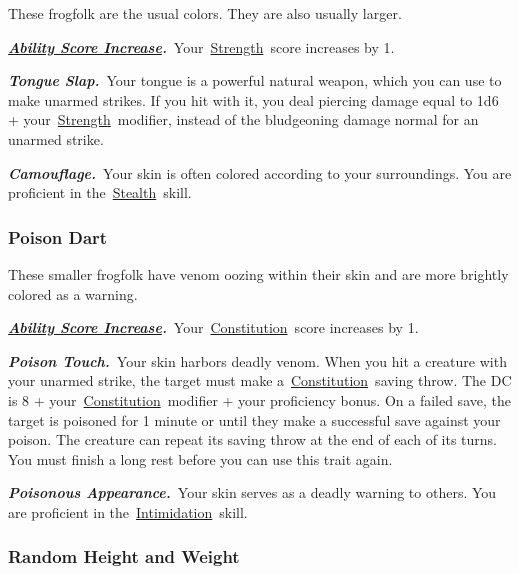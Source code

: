 These frogfolk are the usual colors. They are also usually larger.

\textbf{\emph{\href{https://www.dandwiki.com/wiki/5e_SRD:About_Races\#Ability_Score_Increase}{Ability
Score
Increase}.}}~Your~\href{https://www.dandwiki.com/wiki/5e_SRD:Strength}{Strength}~score
increases by 1.

\textbf{\emph{Tongue Slap.}}~Your tongue is a powerful natural weapon,
which you can use to make unarmed strikes. If you hit with it, you deal
piercing damage equal to 1d6 +
your~\href{https://www.dandwiki.com/wiki/5e_SRD:Strength}{Strength}~modifier,
instead of the bludgeoning damage normal for an unarmed strike.

\textbf{\emph{Camouflage.}}~Your skin is often colored according to your
surroundings. You are proficient in
the~\href{https://www.dandwiki.com/wiki/5e_SRD:Stealth_Skill}{Stealth}~skill.

\subsubsection{\texorpdfstring{\textbf{Poison
Dart}}{Poison Dart}}\label{poison-dart}

These smaller frogfolk have venom oozing within their skin and are more
brightly colored as a warning.

\textbf{\emph{\href{https://www.dandwiki.com/wiki/5e_SRD:About_Races\#Ability_Score_Increase}{Ability
Score
Increase}.}}~Your~\href{https://www.dandwiki.com/wiki/5e_SRD:Constitution}{Constitution}~score
increases by 1.

\textbf{\emph{Poison Touch.}}~Your skin harbors deadly venom. When you
hit a creature with your unarmed strike, the target must make
a~\href{https://www.dandwiki.com/wiki/5e_SRD:Constitution}{Constitution}~saving
throw. The DC is 8 +
your~\href{https://www.dandwiki.com/wiki/5e_SRD:Constitution}{Constitution}~modifier
+ your proficiency bonus. On a failed save, the target is poisoned for 1
minute or until they make a successful save against your poison. The
creature can repeat its saving throw at the end of each of its turns.
You must finish a long rest before you can use this trait again.

\textbf{\emph{Poisonous Appearance.}}~Your skin serves as a deadly
warning to others. You are proficient in
the~\href{https://www.dandwiki.com/wiki/5e_SRD:Intimidation_Skill}{Intimidation}~skill.

\subsubsection{\texorpdfstring{\textbf{Random Height and
Weight}}{Random Height and Weight}}\label{random-height-and-weight}

